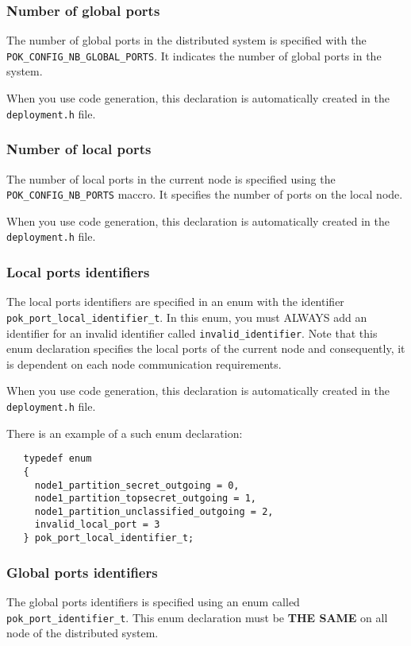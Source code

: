    \subsubsection{Number of global ports}
   The number of global ports in the distributed system is specified
   with the \texttt{POK\_CONFIG\_NB\_GLOBAL\_PORTS}. It indicates the number of
   global ports in the system.

   When you use code generation, this declaration is
   automatically created in the \texttt{deployment.h} file.

   \subsubsection{Number of local ports}
   The number of local ports in the current node is specified
   using the \texttt{POK\_CONFIG\_NB\_PORTS} maccro. It specifies the number of
   ports on the local node.

   When you use code generation, this declaration is
   automatically created in the \texttt{deployment.h} file.

   \subsubsection{Local ports identifiers}
   The local ports identifiers are specified in an enum with the identifier
   \texttt{pok\_port\_local\_identifier\_t}. In this enum, you must ALWAYS
   add an identifier for an invalid identifier called
   \texttt{invalid\_identifier}.
   Note that this enum declaration specifies the local ports of the current node
   and consequently, it is dependent on each node communication requirements.

   When you use code generation, this declaration is
   automatically created in the \texttt{deployment.h} file.

   There is an example of a such enum
   declaration:
   \begin{verbatim}
   typedef enum
   {
     node1_partition_secret_outgoing = 0,
     node1_partition_topsecret_outgoing = 1,
     node1_partition_unclassified_outgoing = 2,
     invalid_local_port = 3
   } pok_port_local_identifier_t;
   \end{verbatim}

   \subsubsection{Global ports identifiers}
   The global ports identifiers is specified using an enum called
   \texttt{pok\_port\_identifier\_t}. This enum declaration must be \textbf{THE SAME}
   on all node of the distributed system.

